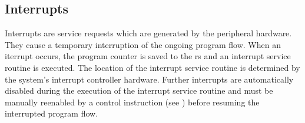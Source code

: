 \subsection{Interrupts}
\label{reset:irq}
Interrupts are service requests which are generated by the peripheral hardware. They cause
a temporary interruption of the ongoing program flow. 
When an iterrupt occurs, the program counter is saved to the \gls{rs} and an interrupt service
routine is executed. The location of the interrupt service routine is determined by the system's
interrupt controller hardware. Further interrupts are automatically disabled during the execution
of the interrupt service routine and must be manually reenabled by a control instruction
(see ) before resuming the interrupted program flow.
